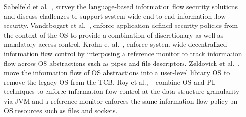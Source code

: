 Sabelfeld et al.~\citep{sabelfeld2003language}, survey the language-based information flow security solutions and discuss challenges to support system-wide end-to-end information flow security.
Vandebogart et al.~\citep{vandebogart+asbestos}, enforce
application-defined security policies from the context of the OS to provide a combination of discretionary as well as mandatory access control.
Krohn et  al.~\citep{krohn+flume}, enforce system-wide decentralized information flow control by interposing a reference monitor to track information flow across OS abstractions such as pipes and file descriptors.
Zeldovich et al.~\citep{zeldovich+histar}, move the information flow of OS abstractions into a user-level library OS to remove the legacy OS from the TCB.
Roy et al., ~\citep{roy2009laminar} combine OS and PL techniques to enforce information flow control at the data structure granularity via JVM and a reference monitor enforces the same 
information flow policy on OS resources such as files and sockets.
